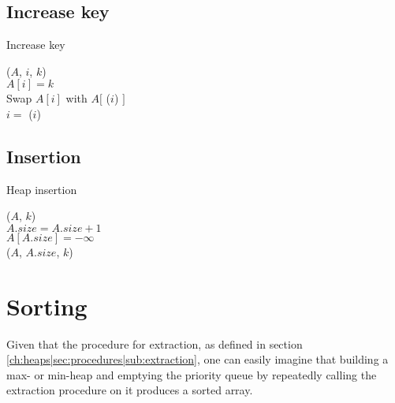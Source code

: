 \subsection{Increase key}
\label{ch:heaps|sec:procedures|sub:increase-key}
\begin{algorithm}[H]
	\caption{Increase key}
	\label{alg:heap-increase-key}
	
	
	
	
	
	\BlankLine
	\IncreaseKey($A$, $i$, $k$) \\
	\Begin
	{
		$A[i] = k$ \\
		{
			Swap $A[i]$ with $A[$ \Parent($i$) $]$ \\
			$i = $ \Parent($i$)
		}
	}
\end{algorithm}

\subsection{Insertion}
\label{ch:heaps|sec:procedures|sub:insertion}
\begin{algorithm}[H]
	\caption{Heap insertion}
	\label{alg:heap-insert}
	
	
	
	
	\BlankLine
	\Insert($A$, $k$) \\
	\Begin
	{
		$A.size = A.size + 1$ \\
		$A[A.size] = -\infty$ \\
		\IncreaseKey($A$, $A.size$, $k$)
	}
\end{algorithm}



\section{Sorting}
Given that the procedure for extraction, as defined in section
\ref{ch:heaps|sec:procedures|sub:extraction}, one can easily imagine that
building a max- or min-heap and emptying the priority queue by repeatedly
calling the extraction procedure on it produces a sorted array.

